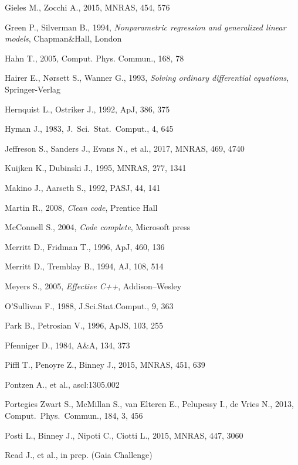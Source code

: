 \documentclass[12pt]{article}
\begin{document}
\begin{thebibliography}{99}
Gieles M., Zocchi A., 2015, MNRAS, 454, 576

Green P., Silverman B., 1994, \textsl{Nonparametric regression and generalized linear models}, Chapman\&Hall, London

Hahn T., 2005, Comput. Phys. Commun., 168, 78

Hairer E., N{\o}rsett S., Wanner G., 1993, \textsl{Solving ordinary differential equations}, Springer-Verlag

Hernquist L., Ostriker J., 1992, ApJ, 386, 375

Hyman J., 1983, J.~Sci.~Stat.~Comput., 4, 645

Jeffreson S., Sanders J., Evans N., et al., 2017, MNRAS, 469, 4740

Kuijken K., Dubinski J., 1995, MNRAS, 277, 1341

Makino J., Aarseth S., 1992, PASJ, 44, 141

Martin R., 2008, \textsl{Clean code}, Prentice Hall

McConnell S., 2004, \textsl{Code complete}, Microsoft press

Merritt D., Fridman T., 1996, ApJ, 460, 136

Merritt D., Tremblay B., 1994, AJ, 108, 514

Meyers S., 2005, \textsl{Effective C++}, Addison--Wesley

O'Sullivan F., 1988, J.Sci.Stat.Comput., 9, 363

Park B., Petrosian V., 1996, ApJS, 103, 255

Pfenniger D., 1984, A\&A, 134, 373

Piffl T., Penoyre Z., Binney J., 2015, MNRAS, 451, 639

Pontzen A., et al., ascl:1305.002

Portegies Zwart S., McMillan S., van Elteren E., Pelupessy I., de Vries N., 2013, Comput.\ Phys.\ Commun., 184, 3, 456

Posti L., Binney J., Nipoti C., Ciotti L., 2015, MNRAS, 447, 3060

Read J., et al., in prep. (Gaia Challenge)


\end{thebibliography}
\end{document}

